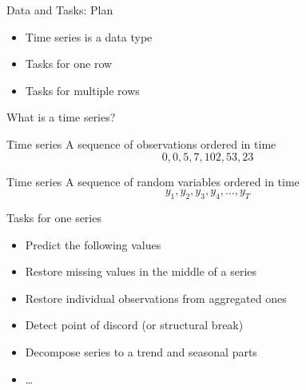 
\begin{frame} %
	
	
\end{frame}



\begin{frame}{Data and Tasks: Plan}
	\begin{itemize}[<+->]
		\item Time series is a data type
		\item Tasks for one row
		\item Tasks for multiple rows
	\end{itemize}
	
\end{frame}





\begin{frame}{What is a time series?}
	
	\begin{block}{Time series}
		A sequence of observations ordered in time
		\[
		0, 0, 5, 7, 102, 53, 23
		\]
	\end{block}
	
	\pause
	\begin{block}{Time series}
		A sequence of random variables ordered in time
		\[
		y_1, y_2, y_3, y_4, \ldots, y_T
		\]
	\end{block}
	
	
\end{frame}


\begin{frame}{Tasks for one series}
	
	\begin{itemize}[<+->]
		\item Predict the following values
		\item Restore missing values in the middle of a series
		\item Restore individual observations from aggregated ones
		\item Detect point of discord (or structural break)
		\item Decompose series to a trend and seasonal parts
		\item \ldots
	\end{itemize}
	
\end{frame}


